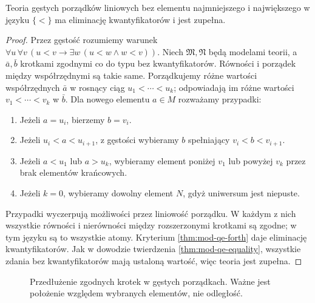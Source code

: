 \begin{twierdzenie}
\label{thm:mod-qe-dlo}
Teoria gęstych porządków liniowych bez elementu
najmniejszego i największego w języku $\{<\}$
ma eliminację kwantyfikatorów i jest zupełna.
\end{twierdzenie}
\begin{proof}
Przez gęstość rozumiemy warunek
$\forall u\,\forall v\,(u<v\to\exists w\,(u<w\land w<v))$.
Niech $\mathfrak M,\mathfrak N$ będą modelami teorii,
a $\bar a,\bar b$ krotkami zgodnymi co do typu bez
kwantyfikatorów. Równości i porządek między
współrzędnymi są takie same. Porządkujemy różne
wartości współrzędnych $\bar a$ w rosnący ciąg
$u_1<\cdots<u_k$; odpowiadają im różne wartości
$v_1<\cdots<v_k$ w $\bar b$.
Dla nowego elementu $a\in M$ rozważamy przypadki:
\begin{enumerate}
\item Jeżeli $a=u_i$, bierzemy $b=v_i$.
\item Jeżeli $u_i<a<u_{i+1}$, z gęstości wybieramy
$b$ spełniający $v_i<b<v_{i+1}$.
\item Jeżeli $a<u_1$ lub $a>u_k$, wybieramy element
poniżej $v_1$ lub powyżej $v_k$ przez brak elementów
krańcowych.
\item Jeżeli $k=0$, wybieramy dowolny element $N$,
gdyż uniwersum jest niepuste.
\end{enumerate}
Przypadki wyczerpują możliwości przez liniowość porządku.
W każdym z nich wszystkie równości i nierówności
między rozszerzonymi krotkami są zgodne; w tym języku
są to wszystkie atomy. Kryterium
\ref{thm:mod-qe-forth} daje eliminację kwantyfikatorów.
Jak w dowodzie twierdzenia \ref{thm:mod-qe-equality},
wszystkie zdania bez kwantyfikatorów mają ustaloną
wartość, więc teoria jest zupełna.
\end{proof}

\begin{figure}[htbp]
\centering
{}
\caption{Przedłużenie zgodnych krotek w gęstych porządkach.
Ważne jest położenie względem wybranych elementów, nie odległość.}
\label{fig:mod-qe-dlo}
\end{figure}

